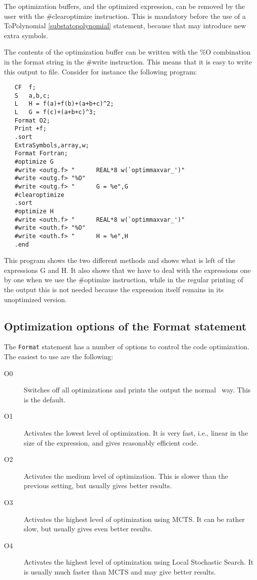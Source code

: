 The optimization buffers, and the optimized expression, can be removed by 
the user with the \#clearoptimize instruction. This is mandatory before the 
use of a ToPolynomial \ref{substatopolynomial} 
statement, because that may introduce new extra symbols.

The contents of the optimization buffer can be 
written with the \%O combination in the format string in the \#write 
instruction. This means that it is easy to write this output to file. 
Consider for instance the following program:
\begin{verbatim}
   CF  f;
   S   a,b,c;
   L   H = f(a)+f(b)+(a+b+c)^2;
   L   G = f(c)+(a+b+c)^3;
   Format O2;
   Print +f;
   .sort
   ExtraSymbols,array,w;
   Format Fortran;
   #optimize G
   #write <outg.f> "      REAL*8 w(`optimmaxvar_')"
   #write <outg.f> "%O"
   #write <outg.f> "      G = %e",G
   #clearoptimize
   .sort
   #optimize H
   #write <outh.f> "      REAL*8 w(`optimmaxvar_')"
   #write <outh.f> "%O"
   #write <outh.f> "      H = %e",H
   .end
\end{verbatim}
This program shows the two different methods and shows what is left of the 
expressions G and H. It also shows that we have to deal with the 
expressions one by one when we use the \#optimize instruction, while in the 
regular printing of the output this is not needed because the expression 
itself remains in its unoptimized version.

\subsection{Optimization options of the Format statement}

The \verb|Format| statement has a number of options to control the
code optimization. The easiest to use are the following:

\begin{description}
\item[O0] Switches off all optimizations and prints the output the
  normal \FORM\ way. This is the default.

\item[O1] Activates the lowest level of optimization. It is very fast,
  i.e., linear in the size of the expression, and gives reasonably
  efficient code.

\item[O2] Activates the medium level of optimization. This is slower
  than the previous setting, but usually gives better results.

\item[O3] Activates the highest level of optimization using MCTS. It can be
  rather slow, but usually gives even better results.

\item[O4] Activates the highest level of optimization using Local Stochastic Search. 
It is usually much faster than MCTS and may give better results.
\end{description}

